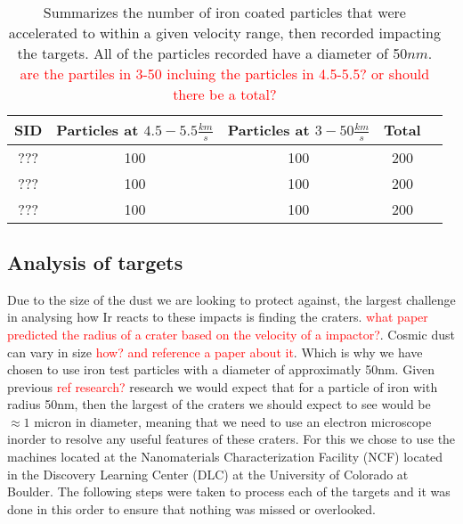 \documentclass[review]{elsarticle}
\begin{document}

		\begin{table}
			\begin{center}
				\begin{tabular}{c|c|c|c|c} 
				SID &  Particles at $4.5-5.5\frac{km}{s}$ & Particles at $3-50\frac{km}{s}$ & Total \\
				\hline
				??? &  100	& 100	& 200\\
				\hline
				??? &  100	& 100	& 200\\
				\hline
				??? &  100	& 100	& 200\\
						
				\end{tabular}
			\end{center}
		\caption
		{
			\label{tab: recordedParticles}
			Summarizes the number of iron coated particles that were accelerated to within a given velocity range, then recorded impacting the targets.
			All of the particles recorded have a diameter of 50$nm$. \textcolor{red}{are the partiles in 3-50 incluing the particles in 4.5-5.5? or should there be a total?}
		}
		\end{table}


	
		\subsection{Analysis of targets}
		Due to the size of the dust we are looking to protect against, the largest challenge in analysing how Ir reacts to these impacts is finding the craters.
		\textcolor{red}{what paper predicted the radius of a crater based on the velocity of a impactor?}. Cosmic dust can vary in size \textcolor{red}{how? and reference a paper about it}. 
		Which is why we have chosen to use iron test particles with a diameter of approximatly 50nm. Given previous \textcolor{red}{ref research?} research we would expect that for
		a particle of iron with radius 50nm, then the largest of the craters we should expect to see would be $\approx 1$ micron in diameter, meaning that we 
		need to use an electron microscope inorder to resolve any useful features of these craters. For this we chose to use the machines located at the Nanomaterials 
		Characterization Facility (NCF) located in the Discovery Learning Center (DLC) at the University of Colorado at Boulder. The following steps were taken to process
		each of the targets and it was done in this order to ensure that nothing was missed or overlooked.
\end{document}
